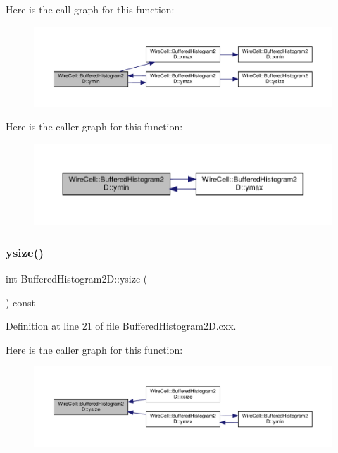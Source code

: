 Here is the call graph for this function\+:
\nopagebreak
\begin{figure}[H]
\begin{center}
\leavevmode
\includegraphics[width=350pt]{class_wire_cell_1_1_buffered_histogram2_d_a772cc0d25c6cf84beb629960d5e3e440_cgraph}
\end{center}
\end{figure}
Here is the caller graph for this function\+:
\nopagebreak
\begin{figure}[H]
\begin{center}
\leavevmode
\includegraphics[width=350pt]{class_wire_cell_1_1_buffered_histogram2_d_a772cc0d25c6cf84beb629960d5e3e440_icgraph}
\end{center}
\end{figure}
\mbox{\label{class_wire_cell_1_1_buffered_histogram2_d_adbf757c3cdbfd1c6f09474bc8a9c2a8f}} 
\subsubsection{\texorpdfstring{ysize()}{ysize()}}
{\footnotesize\ttfamily int Buffered\+Histogram2\+D\+::ysize (\begin{DoxyParamCaption}{ }\end{DoxyParamCaption}) const}



Definition at line 21 of file Buffered\+Histogram2\+D.\+cxx.

Here is the caller graph for this function\+:
\nopagebreak
\begin{figure}[H]
\begin{center}
\leavevmode
\includegraphics[width=350pt]{class_wire_cell_1_1_buffered_histogram2_d_adbf757c3cdbfd1c6f09474bc8a9c2a8f_icgraph}
\end{center}
\end{figure}


